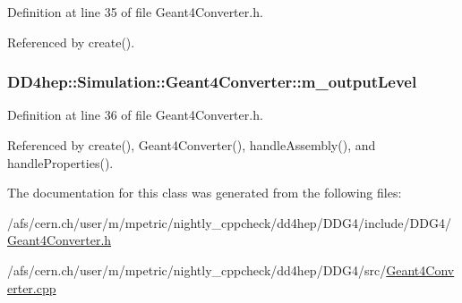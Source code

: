 Definition at line 35 of file Geant4Converter.h.

Referenced by create().\hypertarget{class_d_d4hep_1_1_simulation_1_1_geant4_converter_a0beb45875a3be411994a235aa545dbbc}{
\subsubsection[{m\_\-outputLevel}]{ {\bf DD4hep::Simulation::Geant4Converter::m\_\-outputLevel}}}
\label{class_d_d4hep_1_1_simulation_1_1_geant4_converter_a0beb45875a3be411994a235aa545dbbc}


Definition at line 36 of file Geant4Converter.h.

Referenced by create(), Geant4Converter(), handleAssembly(), and handleProperties().

The documentation for this class was generated from the following files:\begin{DoxyCompactItemize}
\item 
/afs/cern.ch/user/m/mpetric/nightly\_\-cppcheck/dd4hep/DDG4/include/DDG4/\hyperlink{_geant4_converter_8h}{Geant4Converter.h}\item 
/afs/cern.ch/user/m/mpetric/nightly\_\-cppcheck/dd4hep/DDG4/src/\hyperlink{_geant4_converter_8cpp}{Geant4Converter.cpp}\end{DoxyCompactItemize}
